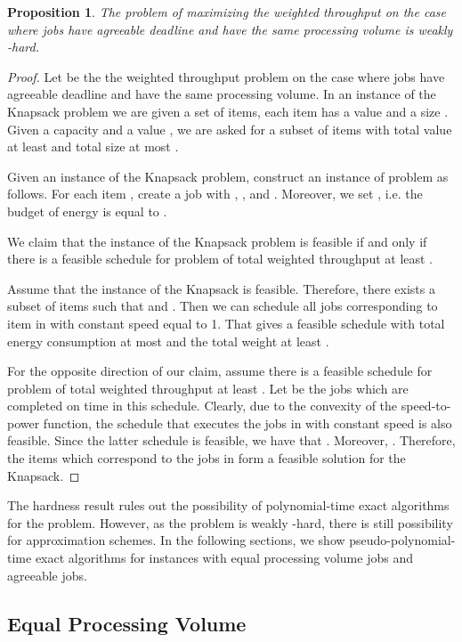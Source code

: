 \documentclass[11pt,a4paper]{article}
\newtheorem{prop}{Proposition}
\begin{document}
\begin{prop}	\label{prop_np_hard}
The problem of maximizing the weighted throughput on the case where jobs have agreeable deadline and have the same processing volume is weakly -hard.
\end{prop}
\begin{proof}
Let  be the the weighted throughput problem on the case where jobs have agreeable deadline and have the same processing volume.
In an instance of the {\sc Knapsack} problem we are given a set of  items, 
each item  has a value  and a size .
Given a capacity  and a value , we are asked for a subset of items with total 
value at least  and total size at most .


Given an instance of the {\sc Knapsack} problem, 
construct an instance of problem  as follows.
For each item , create a job  with 
,  ,  and .
Moreover, we set , i.e. the budget of energy is equal to .

We claim that the instance of the {\sc Knapsack} problem is feasible 
if and only if there is a feasible schedule for problem 
of total weighted throughput at least .

Assume that the instance of the {\sc Knapsack} is feasible.
Therefore, there exists  a subset of items  such that  and .
Then we can schedule all jobs corresponding to item in  
with constant speed equal to 1. That gives a feasible schedule
with total energy consumption at most  and the total weight at least . 

For the opposite direction of our claim, assume there is a feasible schedule for
problem  of total weighted throughput at least .
Let  be the jobs which are completed on time in this schedule.
Clearly, due to the convexity of the speed-to-power function, the schedule that 
executes the jobs in  with constant speed is also feasible.
Since the latter schedule is feasible, we have that .
Moreover, .
Therefore, the items which correspond to the jobs in  form a feasible solution for the {\sc Knapsack}. 
\end{proof}

The hardness result rules out the possibility of polynomial-time exact algorithms for the problem. 
However, as the problem is weakly -hard, there is still possibility for approximation schemes. 
In the following sections, we show pseudo-polynomial-time exact algorithms for instances with 
equal processing volume jobs 
and agreeable jobs.  



\subsection{Equal Processing Volume}
\end{document}
